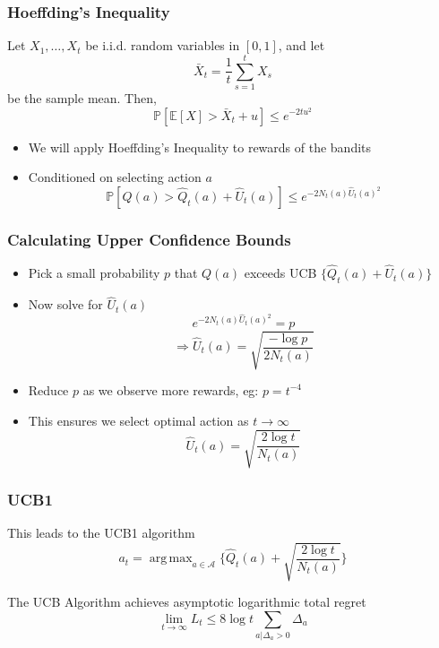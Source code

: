 \documentclass[handout]{beamer}
\DeclareMathOperator*{\argmax}{arg\,max}
\begin{document}
\begin{frame}
\frametitle{Hoeffding's Inequality}
\pause
\begin{theorem}
Let $X_1, \ldots, X_t$ be i.i.d. random variables in $[0,1]$, and let $$\bar{X}_t = \frac 1 t \sum_{s=1}^t X_s$$ be the sample mean. Then,
$$\mathbb{P}[\mathbb{E}[X] > \bar{X}_t + u] \leq e^{-2tu^2}$$
\end{theorem}
\begin{itemize}[<+->]
\item We will apply Hoeffding's Inequality to rewards of the bandits
\item Conditioned on selecting action $a$
$$\mathbb{P}[Q(a) > \hat{Q}_t(a) + \hat{U}_t(a)] \leq e^{-2N_t(a)\hat{U}_t(a)^2}$$
\end{itemize}
\end{frame}



\begin{frame}
\frametitle{Calculating Upper Confidence Bounds}
\pause
\begin{itemize}[<+->]
\item Pick a small probability $p$ that $Q(a)$ exceeds UCB $\{\hat{Q}_t(a) + \hat{U}_t(a)\}$
\item Now solve for $\hat{U}_t(a)$
$$e^{-2N_t(a)\hat{U}_t(a)^2} = p$$
$$\Rightarrow \hat{U}_t(a) = \sqrt{\frac {-\log p} {2 N_t(a)}}$$
\item Reduce $p$ as we observe more rewards, eg: $p = t^{-4}$
\item This ensures we select optimal action as $t\rightarrow \infty$
$$\hat{U}_t(a) = \sqrt{\frac {2 \log t} {N_t(a)}}$$
\end{itemize}
\end{frame}

\begin{frame}
\frametitle{UCB1}
\pause
This leads to the UCB1 algorithm
$$a_t = \argmax_{a\in \mathcal{A}} \{ \hat{Q}_t(a) + \sqrt{\frac {2 \log t} {N_t(a)}} \}$$
\begin{theorem}
The UCB Algorithm achieves asymptotic logarithmic total regret
$$\lim_{t\rightarrow \infty} L_t \leq 8 \log t \sum_{a|\Delta_a > 0} \Delta_a$$
\end{theorem}
\end{frame}
\end{document}
